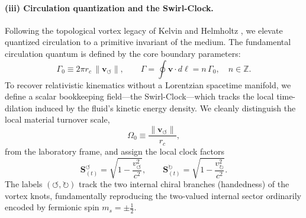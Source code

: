 \documentclass[11pt,a4paper]{article}
\newcommand{\rc}{r_c}
\begin{document}
        \paragraph{(iii) Circulation quantization and the Swirl-Clock.}
            Following the topological vortex legacy of Kelvin and Helmholtz \cite{Kelvin1869, Helmholtz1858}, we elevate quantized circulation to a primitive invariant of the medium. The fundamental circulation quantum is defined by the core boundary parameters:
            \begin{equation}
                \label{eq:Gamma0}
                \boxed{
                    \Gamma_0 \equiv 2\pi \rc\,\lVert \mathbf{v}_{\!\boldsymbol{\circlearrowleft}}\rVert,
                    \qquad
                    \Gamma = \oint \mathbf v\cdot d\boldsymbol\ell = n\,\Gamma_0, \quad n \in \mathbb{Z}.
                }
            \end{equation}
            To recover relativistic kinematics without a Lorentzian spacetime manifold, we define a scalar bookkeeping field---the Swirl-Clock---which tracks the local time-dilation induced by the fluid's kinetic energy density. We cleanly distinguish the local material turnover scale,
            \begin{equation}
                \label{eq:Omega0}
                \Omega_0 \equiv \frac{\lVert \mathbf{v}_{\!\boldsymbol{\circlearrowleft}}\rVert}{\rc},
            \end{equation}
            from the laboratory frame, and assign the local clock factors
            \begin{equation}
                \label{eq:SwirlClock}
                \mathbf{S}_{(t)}^{\!\boldsymbol{\circlearrowleft}} = \sqrt{1-\frac{v_{\!\boldsymbol{\circlearrowleft}}^{2}}{c^2}},
                \qquad
                \mathbf{S}_{(t)}^{\!\boldsymbol{\circlearrowright}} = \sqrt{1-\frac{v_{\!\boldsymbol{\circlearrowright}}^{2}}{c^2}}.
            \end{equation}
            The labels $(\!\boldsymbol{\circlearrowleft}, \!\boldsymbol{\circlearrowright})$ track the two internal chiral branches (handedness) of the vortex knots, fundamentally reproducing the two-valued internal sector ordinarily encoded by fermionic spin $m_s=\pm \tfrac12$.
        
\end{document}
